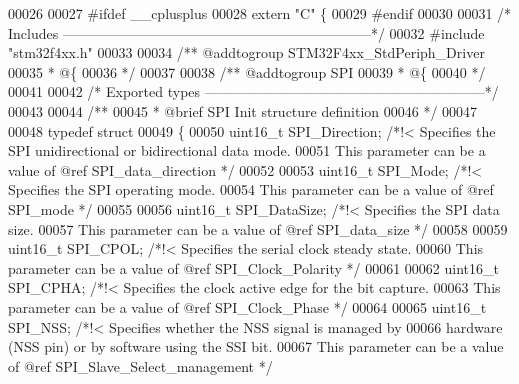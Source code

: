 \begin{DoxyCode}
00026 
00027 \textcolor{preprocessor}{#}\textcolor{preprocessor}{ifdef} \_\_cplusplus
00028  \textcolor{keyword}{extern} \textcolor{stringliteral}{"C"} \{
00029 \textcolor{preprocessor}{#}\textcolor{preprocessor}{endif}
00030 
00031 \textcolor{comment}{/* Includes ------------------------------------------------------------------*/}
00032 \textcolor{preprocessor}{#}\textcolor{preprocessor}{include} "stm32f4xx.h"
00033 
00034 \textcolor{comment}{/** @addtogroup STM32F4xx\_StdPeriph\_Driver}
00035 \textcolor{comment}{  * @\{}
00036 \textcolor{comment}{  */}
00037 
00038 \textcolor{comment}{/** @addtogroup SPI}
00039 \textcolor{comment}{  * @\{}
00040 \textcolor{comment}{  */}
00041 
00042 \textcolor{comment}{/* Exported types ------------------------------------------------------------*/}
00043 
00044 \textcolor{comment}{/** }
00045 \textcolor{comment}{  * @brief  SPI Init structure definition  }
00046 \textcolor{comment}{  */}
00047 
00048 \textcolor{keyword}{typedef} \textcolor{keyword}{struct}
00049 \{
00050   uint16\_t SPI_Direction;           \textcolor{comment}{/*!< Specifies the SPI unidirectional or bidirectional data mode.}
00051 \textcolor{comment}{                                         This parameter can be a value of @ref SPI\_data\_direction */}
00052 
00053   uint16\_t SPI_Mode;                \textcolor{comment}{/*!< Specifies the SPI operating mode.}
00054 \textcolor{comment}{                                         This parameter can be a value of @ref SPI\_mode */}
00055 
00056   uint16\_t SPI_DataSize;            \textcolor{comment}{/*!< Specifies the SPI data size.}
00057 \textcolor{comment}{                                         This parameter can be a value of @ref SPI\_data\_size */}
00058 
00059   uint16\_t SPI_CPOL;                \textcolor{comment}{/*!< Specifies the serial clock steady state.}
00060 \textcolor{comment}{                                         This parameter can be a value of @ref SPI\_Clock\_Polarity */}
00061 
00062   uint16\_t SPI_CPHA;                \textcolor{comment}{/*!< Specifies the clock active edge for the bit capture.}
00063 \textcolor{comment}{                                         This parameter can be a value of @ref SPI\_Clock\_Phase */}
00064 
00065   uint16\_t SPI_NSS;                 \textcolor{comment}{/*!< Specifies whether the NSS signal is managed by}
00066 \textcolor{comment}{                                         hardware (NSS pin) or by software using the SSI bit.}
00067 \textcolor{comment}{                                         This parameter can be a value of @ref
       SPI\_Slave\_Select\_management */}

\end{DoxyCode}
